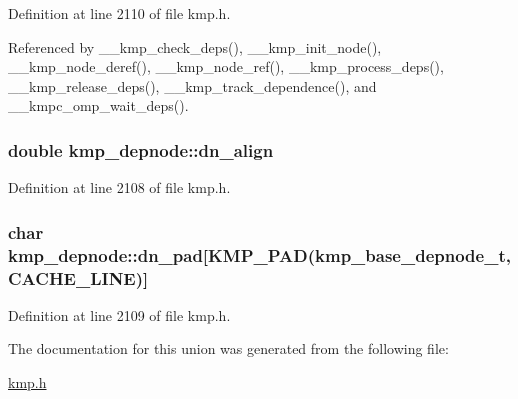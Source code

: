 Definition at line 2110 of file kmp.\-h.



Referenced by \-\_\-\-\_\-kmp\-\_\-check\-\_\-deps(), \-\_\-\-\_\-kmp\-\_\-init\-\_\-node(), \-\_\-\-\_\-kmp\-\_\-node\-\_\-deref(), \-\_\-\-\_\-kmp\-\_\-node\-\_\-ref(), \-\_\-\-\_\-kmp\-\_\-process\-\_\-deps(), \-\_\-\-\_\-kmp\-\_\-release\-\_\-deps(), \-\_\-\-\_\-kmp\-\_\-track\-\_\-dependence(), and \-\_\-\-\_\-kmpc\-\_\-omp\-\_\-wait\-\_\-deps().

\hypertarget{unionkmp__depnode_a347b4791e41750279971e4ec00993f7e}{
\subsubsection[{dn\-\_\-align}]{\setlength{\rightskip}{0pt plus 5cm}double kmp\-\_\-depnode\-::dn\-\_\-align}}\label{unionkmp__depnode_a347b4791e41750279971e4ec00993f7e}


Definition at line 2108 of file kmp.\-h.

\hypertarget{unionkmp__depnode_aad9f486cd3fe36dc5c4cf0c3580234a6}{
\subsubsection[{dn\-\_\-pad}]{\setlength{\rightskip}{0pt plus 5cm}char kmp\-\_\-depnode\-::dn\-\_\-pad\mbox{[}{\bf K\-M\-P\-\_\-\-P\-A\-D}({\bf kmp\-\_\-base\-\_\-depnode\-\_\-t}, {\bf C\-A\-C\-H\-E\-\_\-\-L\-I\-N\-E})\mbox{]}}}\label{unionkmp__depnode_aad9f486cd3fe36dc5c4cf0c3580234a6}


Definition at line 2109 of file kmp.\-h.



The documentation for this union was generated from the following file\-:\begin{DoxyCompactItemize}
\item 
\hyperlink{kmp_8h}{kmp.\-h}\end{DoxyCompactItemize}
